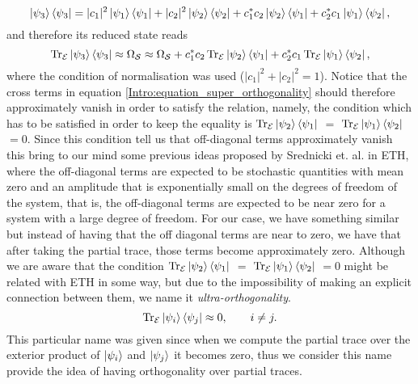 \begin{equation}
\mathinner{|{\psi_3}\rangle}\mathinner{\langle{\psi_3}|} = |c_1|^2 \mathinner{|{\psi_1}\rangle}\mathinner{\langle{\psi_1}|} + |c_2|^2 \mathinner{|{\psi_2}\rangle}\mathinner{\langle{\psi_2}|}+c_1^*c_2\mathinner{|{\psi_2}\rangle}\mathinner{\langle{\psi_1}|} + c_2^*c_1\mathinner{|{\psi_1}\rangle}\mathinner{\langle{\psi_2}|},
\end{equation}
and therefore its reduced state reads
\begin{equation}
\operatorname{Tr}_{\mathcal{E}}\mathinner{|{\psi_3}\rangle}\mathinner{\langle{\psi_3}|} \approx \Omega_{\mathcal{S}}\approx \Omega_{\mathcal{S}}+c_1^*c_2\operatorname{Tr}_{\mathcal{E}}\mathinner{|{\psi_2}\rangle}\mathinner{\langle{\psi_1}|} + c_2^*c_1\operatorname{Tr}_{\mathcal{E}}\mathinner{|{\psi_1}\rangle}\mathinner{\langle{\psi_2}|},
\label{Intro:equation_super_orthogonality}
\end{equation}
where the condition of normalisation was used ($|c_1|^2 + |c_2|^2 =1$). Notice that the cross terms in equation \eqref{Intro:equation_super_orthogonality} should therefore approximately vanish in order to satisfy the relation, namely, the condition which has to be satisfied in order to keep the equality is $\operatorname{Tr}_{\mathcal{E}}\mathinner{|{\psi_2}\rangle}\mathinner{\langle{\psi_1}|}$ $=$ $\operatorname{Tr}_{\mathcal{E}}\mathinner{|{\psi_1}\rangle}\mathinner{\langle{\psi_2}|}$ $=0$. Since this condition tell us that off-diagonal terms approximately vanish this bring to our mind some previous ideas proposed by Srednicki et. al.\cite{srednicki_chaos_1994,deutsch_quantum_1991,rigol_alternatives_2012} in ETH, where the off-diagonal terms are expected to be stochastic quantities with mean zero and an amplitude that is exponentially small on the degrees of freedom of the system, that is, the off-diagonal terms are expected to be near zero for a system with a large degree of freedom. For our case, we have something similar but instead of having that the off diagonal terms are near to zero, we have that after taking the partial trace, those terms become approximately zero. Although we are aware that the condition $\operatorname{Tr}_{\mathcal{E}}\mathinner{|{\psi_2}\rangle}\mathinner{\langle{\psi_1}|}$ $=$ $\operatorname{Tr}_{\mathcal{E}}\mathinner{|{\psi_1}\rangle}\mathinner{\langle{\psi_2}|}$ $=0$ might be related with ETH in some way, but due to the impossibility of making an explicit connection between them, we name it \textit{ultra-orthogonality}. 
\begin{equation}
\operatorname{Tr}_{\mathcal{E}}\mathinner{|{\psi_i}\rangle}\mathinner{\langle{\psi_j}|} \approx 0,\quad \quad i\neq j.
\label{Intro:Condition_ultraorthogonality}
\end{equation}
\indent This particular name was given since when we compute the partial trace over the exterior product of $\mathinner{|{\psi_i}\rangle}$ and $\mathinner{|{\psi_j}\rangle}$ it becomes zero, thus we consider this name provide the idea of having orthogonality over partial traces.\\


